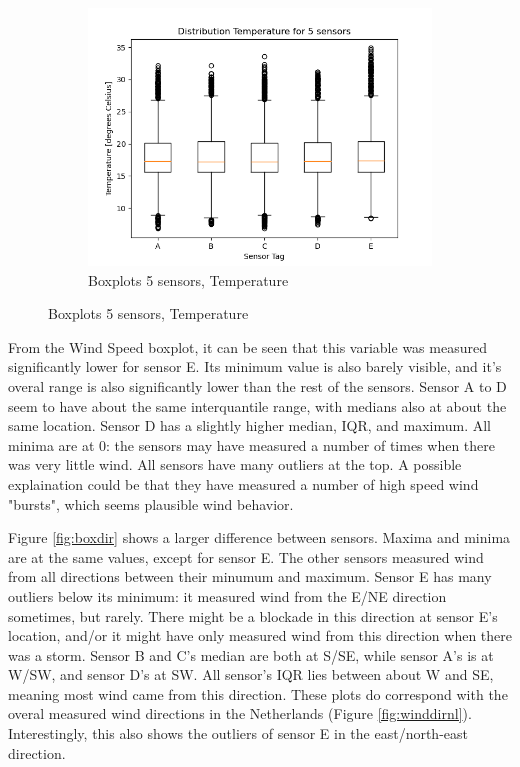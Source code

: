 \documentclass{report}
\begin{document}
\begin{figure}[H]
		\begin{subfigure}[b]{0.7\linewidth}
			\includegraphics[width=\linewidth]{GEO1001_hw01_images/GEO1001_hw01_A1_box_temp.png}
			\caption{Boxplots 5 sensors, Temperature}
			\label{fig:boxtemp}
		\end{subfigure}
	\end{figure}

	From the Wind Speed boxplot, it can be seen that this variable was measured significantly lower for sensor E. Its minimum value is also barely visible, and it's overal range is also significantly lower than the rest of the sensors. Sensor A to D seem to have about the same interquantile range, with medians also at about the same location. Sensor D has a slightly higher median, IQR, and maximum. All minima are at 0: the sensors may have measured a number of times when there was very little wind. All sensors have many outliers at the top. A possible explaination could be that they have measured a number of high speed wind "bursts", which seems plausible wind behavior.
	
	Figure \ref{fig:boxdir} shows a larger difference between sensors. Maxima and minima are at the same values, except for sensor E. The other sensors measured wind from all directions between their minumum and maximum. Sensor E has many outliers below its minimum: it measured wind from the E/NE direction sometimes, but rarely. There might be a blockade in this direction at sensor E's location, and/or it might have only measured wind from this direction when there was a storm. Sensor B and C's median are both at S/SE, while sensor A's is at W/SW, and sensor D's at SW. All sensor's IQR lies between about W and SE, meaning most wind came from this direction. These plots do correspond with the overal measured wind directions in the Netherlands (Figure \ref{fig:winddirnl}). Interestingly, this also shows the outliers of sensor E in the east/north-east direction.
	
\end{document}
